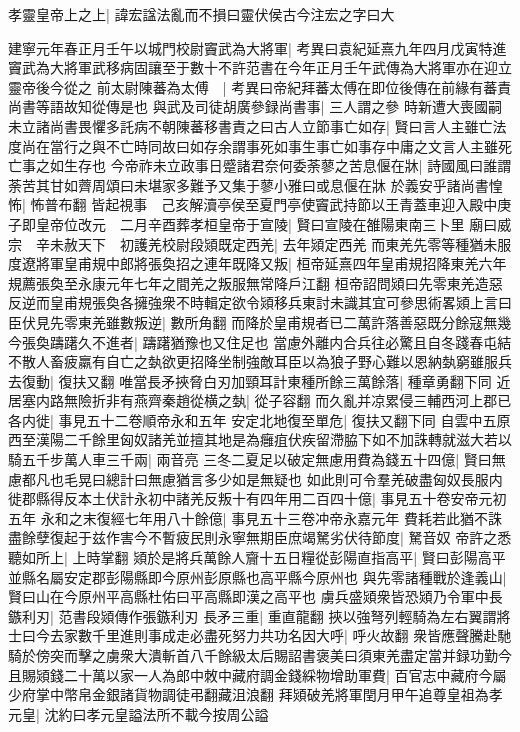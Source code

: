 孝靈皇帝上之上|{
	諱宏諡法亂而不損曰靈伏侯古今注宏之字曰大}


建寧元年春正月壬午以城門校尉竇武為大將軍|{
	考異曰袁紀延熹九年四月戊寅特進竇武為大將軍武移病固讓至于數十不許范書在今年正月壬午武傳為大將軍亦在迎立靈帝後今從之}
前太尉陳蕃為太傅　|{
	考異曰帝紀拜蕃太傅在即位後傳在前緣有蕃責尚書等語故知從傳是也}
與武及司徒胡廣參録尚書事|{
	三人謂之參}
時新遭大喪國嗣未立諸尚書畏懼多託病不朝陳蕃移書責之曰古人立節事亡如存|{
	賢曰言人主雖亡法度尚在當行之與不亡時同故曰如存余謂事死如事生事亡如事存中庸之文言人主雖死亡事之如生存也}
今帝祚未立政事日蹙諸君奈何委荼蓼之苦息偃在牀|{
	詩國風曰誰謂荼苦其甘如薺周頌曰未堪家多難予又集于蓼小雅曰或息偃在牀}
於義安乎諸尚書惶怖|{
	怖普布翻}
皆起視事　己亥解瀆亭侯至夏門亭使竇武持節以王青蓋車迎入殿中庚子即皇帝位改元　二月辛酉葬孝桓皇帝于宣陵|{
	賢曰宣陵在雒陽東南三卜里}
廟曰威宗　辛未赦天下　初護羌校尉段熲既定西羌|{
	去年熲定西羌}
而東羌先零等種猶未服度遼將軍皇甫規中郎將張奐招之連年既降又叛|{
	桓帝延熹四年皇甫規招降東羌六年規薦張奐至永康元年七年之間羌之叛服無常降戶江翻}
桓帝詔問熲曰先零東羌造惡反逆而皇甫規張奐各擁強衆不時輯定欲令熲移兵東討未識其宜可參思術畧熲上言曰臣伏見先零東羌雖數叛逆|{
	數所角翻}
而降於皇甫規者已二萬許落善惡既分餘寇無幾今張奐躊躇久不進者|{
	躊躇猶豫也又住足也}
當慮外離内合兵往必驚且自冬踐春屯結不散人畜疲羸有自亡之埶欲更招降坐制強敵耳臣以為狼子野心難以恩納埶窮雖服兵去復動|{
	復扶又翻}
唯當長矛挾脅白刃加頸耳計東種所餘三萬餘落|{
	種章勇翻下同}
近居塞内路無險折非有燕齊秦趙從横之埶|{
	從子容翻}
而久亂并凉累侵三輔西河上郡已各内徙|{
	事見五十二卷順帝永和五年}
安定北地復至單危|{
	復扶又翻下同}
自雲中五原西至漢陽二千餘里匈奴諸羌並擅其地是為癰疽伏疾留滯脇下如不加誅轉就滋大若以騎五千步萬人車三千兩|{
	兩音亮}
三冬二夏足以破定無慮用費為錢五十四億|{
	賢曰無慮都凡也毛晃曰總計曰無慮猶言多少如是無疑也}
如此則可令羣羌破盡匈奴長服内徙郡縣得反本土伏計永初中諸羌反叛十有四年用二百四十億|{
	事見五十卷安帝元初五年}
永和之末復經七年用八十餘億|{
	事見五十三卷冲帝永嘉元年}
費耗若此猶不誅盡餘孽復起于兹作害今不暫疲民則永寧無期臣庶竭駑劣伏待節度|{
	駑音奴}
帝許之悉聽如所上|{
	上時掌翻}
熲於是將兵萬餘人齎十五日糧從彭陽直指高平|{
	賢曰彭陽高平並縣名屬安定郡彭陽縣即今原州彭原縣也高平縣今原州也}
與先零諸種戰於逢義山|{
	賢曰山在今原州平高縣杜佑曰平高縣即漢之高平也}
虜兵盛熲衆皆恐熲乃令軍中長鏃利刃|{
	范書段熲傳作張鏃利刃}
長矛三重|{
	重直龍翻}
挾以強弩列輕騎為左右翼謂將士曰今去家數千里進則事成走必盡死努力共功名因大呼|{
	呼火故翻}
衆皆應聲騰赴馳騎於傍突而擊之虜衆大潰斬首八千餘級太后賜詔書褒美曰須東羌盡定當并録功勤今且賜熲錢二十萬以家一人為郎中敇中藏府調金錢綵物增助軍費|{
	百官志中藏府今屬少府掌中幣帛金銀諸貨物調徒弔翻藏沮浪翻}
拜熲破羌將軍閏月甲午追尊皇祖為孝元皇|{
	沈約曰孝元皇謚法所不載今按周公謚}


